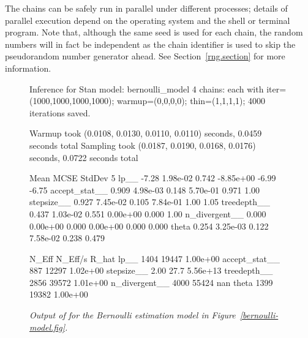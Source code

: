 \documentclass[article]{jss}
\begin{document}
The chains can be safely run in parallel under different processes;
details of parallel execution depend on the operating system and the shell or
terminal program. Note that, although the same seed is used for each chain, the
random numbers will in fact be independent as the chain identifier
is used to skip the pseudorandom number generator ahead.  See
Section~\ref{rng.section} for more information.

\begin{figure}
\begin{Code}
Inference for Stan model: bernoulli_model
4 chains: each with iter=(1000,1000,1000,1000); warmup=(0,0,0,0); 
                    thin=(1,1,1,1); 4000 iterations saved.

Warmup took (0.0108, 0.0130, 0.0110, 0.0110) seconds, 0.0459 seconds total
Sampling took (0.0187, 0.0190, 0.0168, 0.0176) seconds, 0.0722 seconds total

                 Mean      MCSE  StdDev         5%
lp__            -7.28  1.98e-02   0.742  -8.85e+00  -6.99  -6.75
accept_stat__   0.909  4.98e-03   0.148   5.70e-01  0.971   1.00
stepsize__      0.927  7.45e-02   0.105   7.84e-01   1.00   1.05
treedepth__     0.437  1.03e-02   0.551   0.00e+00  0.000   1.00
n_divergent__   0.000  0.00e+00   0.000   0.00e+00  0.000  0.000
theta           0.254  3.25e-03   0.122   7.58e-02  0.238  0.479

                N_Eff  N_Eff/s     R_hat
lp__             1404    19447  1.00e+00
accept_stat__     887    12297  1.02e+00
stepsize__       2.00     27.7  5.56e+13
treedepth__      2856    39572  1.01e+00
n_divergent__    4000    55424       nan
theta            1399    19382  1.00e+00
\end{Code}
\caption{\it Output of  for the Bernoulli estimation model in
  Figure~\ref{bernoulli-model.fig}.}\label{print-output.fig}
\end{figure}
\end{document}
